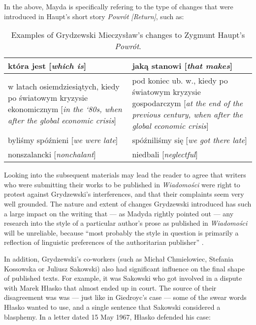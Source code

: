 \begin{paper}
\noindent In the above, Mayda is specifically refering to the type of changes that were introduced in Haupt's short
story \emph{Powrót [Return]}, such as:

\begin{table}[H]
    \centering\small
    \caption{Examples of Grydzewski Mieczysław's changes to Zygmunt Haupt's \emph{Powrót}.}
    \begin{tabular}{p{4.75cm}|p{4.75cm}}
    \toprule
        która jest {[}\emph{which is}{]} & jaką stanowi {[}\emph{that makes}{]} \\
    \midrule
        w latach osiemdziesiątych, kiedy po światowym kryzysie ekonomicznym {[}\emph{in the `80s, when after the global economic crisis}{]} & pod koniec ub. w., kiedy po światowym kryzysie gospodarczym {[}\emph{at the end of the previous century, when after the global economic crisis}{]} \\
    \midrule
        byliśmy spóźnieni {[}\emph{we were late}{]} & spóźniliśmy się {[}\emph{we got there late}{]} \\
    \midrule
        nonszalancki {[}\emph{nonchalant}{]} & niedbali {[}\emph{neglectful}{]} \\
    \bottomrule
    \end{tabular}
\end{table}

\noindent Looking into the subsequent materials may lead the reader to agree that
writers who were submitting their works to be published
in \emph{Wiadomości} were right to protest against Grydzewski's
interferences, and that their complaints seem very well grounded. The nature
and extent of changes Grydzewski introduced has such a large impact on the writing that --- as Madyda
rightly pointed out --- any research into the style of a particular author's prose as published in
\emph{Wiadomości} will be unreliable, because ``most probably the style
in question is primarily a reflection of linguistic preferences of the
authoritarian publisher'' \citep[231]{madyda_od_2015}.

In addition, Grydzewski's co-workers (such as Michał Chmielowiec, Stefania Kossowska
or Juliusz Sakowski) also had significant influence on the final shape of published texts. For example, it was Sakowski who got involved in a dispute with Marek
Hłasko that almost ended up in court. The source of their disagreement was was --- just
like in Giedroyc's case --- some of the swear words Hłasko wanted to use, and a
single sentence that Sakowski considered a blasphemy. In a letter
dated 15 May 1967, Hłasko defended his case:


\end{paper}
